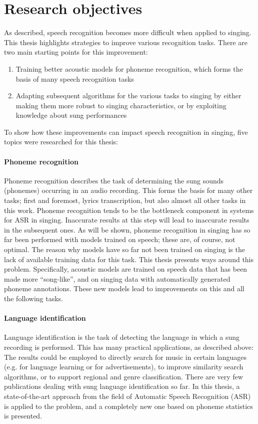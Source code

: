 \section{Research objectives}
As described, speech recognition becomes more difficult when applied to singing. This thesis highlights strategies to improve various recognition tasks. There are two main starting points for this improvement:
\begin{enumerate}
\item Training better acoustic models for phoneme recognition, which forms the basis of many speech recognition tasks
\item Adapting subsequent algorithms for the various tasks to singing by either making them more robust to singing characteristics, or by exploiting knowledge about sung performances
\end{enumerate}

To show how these improvements can impact speech recognition in singing, five topics were researched for this thesis:

\paragraph{Phoneme recognition}
Phoneme recognition describes the task of determining the sung sounds (phonemes) occurring in an audio recording. This forms the basis for many other tasks; first and foremost, lyrics transcription, but also almost all other tasks in this work. Phoneme recognition tends to be the bottleneck component in systems for ASR in singing. Inaccurate results at this step will lead to inaccurate results in the subsequent ones.
As will be shown, phoneme recognition in singing has so far been performed with models trained on speech; these are, of course, not optimal. The reason why models have so far not been trained on singing is the lack of available training data for this task. This thesis presents ways around this problem. Specifically, acoustic models are trained on speech data that has been made more ``song-like'', and on singing data with automatically generated phoneme annotations. These new models lead to improvements on this and all the following tasks.

\paragraph{Language identification}
Language identification is the task of detecting the language in which a sung recording is performed. This has many practical applications, as described above: The results could be employed to directly search for music in certain languages (e.g. for language learning or for advertisements), to improve similarity search algorithms, or to support regional and genre classification.
There are very few publications dealing with sung language identification so far. In this thesis, a state-of-the-art approach from the field of Automatic Speech Recognition (ASR) is applied to the problem, and a completely new one based on phoneme statistics is presented.


